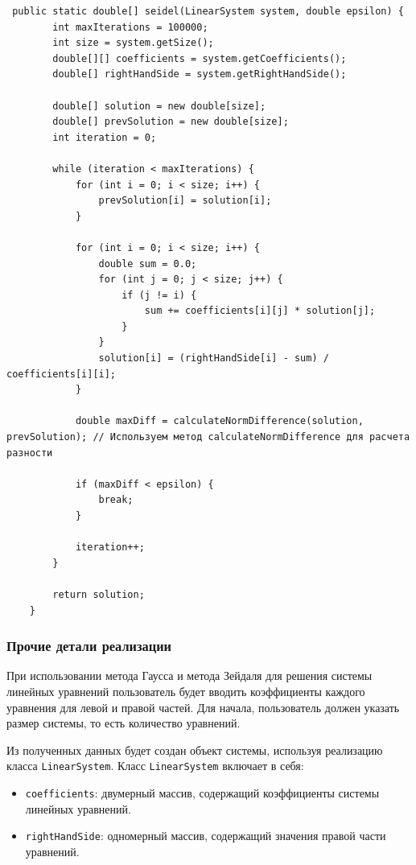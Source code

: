 \documentclass[12pt]{article}
\begin{document}
    \begin{verbatim}
 public static double[] seidel(LinearSystem system, double epsilon) {
        int maxIterations = 100000;
        int size = system.getSize();
        double[][] coefficients = system.getCoefficients();
        double[] rightHandSide = system.getRightHandSide();

        double[] solution = new double[size];
        double[] prevSolution = new double[size];
        int iteration = 0;

        while (iteration < maxIterations) {
            for (int i = 0; i < size; i++) {
                prevSolution[i] = solution[i];
            }

            for (int i = 0; i < size; i++) {
                double sum = 0.0;
                for (int j = 0; j < size; j++) {
                    if (j != i) {
                        sum += coefficients[i][j] * solution[j];
                    }
                }
                solution[i] = (rightHandSide[i] - sum) / coefficients[i][i];
            }

            double maxDiff = calculateNormDifference(solution, prevSolution); // Используем метод calculateNormDifference для расчета разности

            if (maxDiff < epsilon) {
                break;
            }

            iteration++;
        }

        return solution;
    }
    \end{verbatim}

    \subsubsection{Прочие детали реализации}

    При использовании метода Гаусса и метода Зейдаля для решения системы линейных уравнений пользователь будет вводить коэффициенты каждого уравнения для левой и правой частей. Для начала, пользователь должен указать размер системы, то есть количество уравнений.

    Из полученных данных будет создан объект системы, используя реализацию класса \texttt{LinearSystem}. Класс \texttt{LinearSystem} включает в себя:

    \begin{itemize}
        \item \texttt{coefficients}: двумерный массив, содержащий коэффициенты системы линейных уравнений.
        \item \texttt{rightHandSide}: одномерный массив, содержащий значения правой части уравнений.
    \end{itemize}
\end{document}
